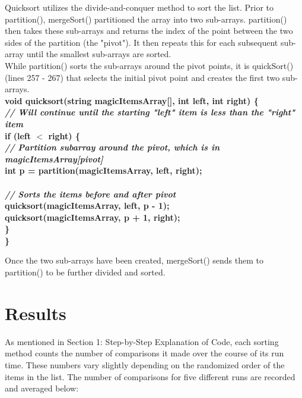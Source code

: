 \documentclass{article}
\begin{document}
Quicksort utilizes the divide-and-conquer method to sort the list. Prior to partition(), mergeSort() partitioned the array into two sub-arrays. partition() then takes these sub-arrays and returns the index of the point between the two sides of the partition (the "pivot"). It then repeats this for each subsequent sub-array until the smallest sub-arrays are sorted.\\
While partition() sorts the sub-arrays around the pivot points, it is quickSort() (lines 257 - 267) that selects the initial pivot point and creates the first two sub-arrays. \\

\textbf{
void quicksort(string magicItemsArray[], int left, int right) \{\\
    \textit{\indent // Will continue until the starting "left" item is less than the "right" item\\}
    \indent if (left $<$ right) \{\\
        \textit{\indent \indent // Partition subarray around the pivot, which is in magicItemsArray[pivot]\\}
        \indent \indent int p = partition(magicItemsArray, left, right);\\
\\
        \textit{\indent \indent // Sorts the items before and after pivot\\}
        \indent \indent quicksort(magicItemsArray, left, p - 1);\\
        \indent \indent quicksort(magicItemsArray, p + 1, right);\\
    \indent \}\\
\}\\
}

Once the two sub-arrays have been created, mergeSort() sends them to partition() to be further divided and sorted.


\pagebreak
\section{Results}
As mentioned in Section 1: Step-by-Step Explanation of Code, each sorting method counts the number of comparisons it made over the course of its run time. These numbers vary slightly depending on the randomized order of the items in the list. The number of comparisons for five different runs are recorded and averaged below:\\
\end{document}
